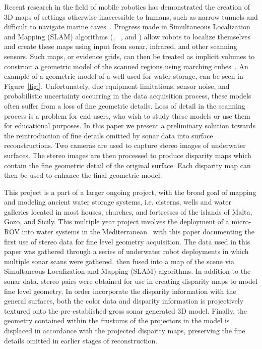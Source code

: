 \documentclass[a4paper,twoside]{article}
\begin{document}

\noindent Recent research in the field of mobile robotics has demonstrated the creation of 3D maps of settings otherwise inaccessible to humans, such as narrow tunnels and difficult to navigate marine caves~\cite{ICEX11,McVicker,McVicker2}. Progress made in Simultaneous Localization and Mapping (SLAM) algorithms  (\cite{Williams2000}, ~\cite{harbor}, and \cite{Fairfield2005,Fairfield2006}) allow robots to localize themselves and create these maps using input from sonar, infrared, and other scanning sensors. Such maps, or evidence grids, can then be treated as implicit volumes to construct a geometric model of the scanned regions using marching cubes~\cite{Lorensen}. An example of a geometric model of a well used for water storage, can be seen in Figure~\ref{fig:}.
Unfortunately, due equipment limitations, sensor noise, and probabilistic uncertainty occurring in the  data acquisition process, these models often suffer from a loss of fine geometric details. Loss of detail in the scanning process is a problem for end-users, who wish to study these models or use them for educational purposes.
In this paper we present a preliminary solution towards the reintroduction of fine details omitted by sonar data into surface reconstructions.  
Two cameras are used to capture stereo images of underwater surfaces.
The stereo images are then processed to produce disparity maps which contain the fine geometric detail of the original surface.
Each disparity map can then be used to enhance the final geometric model.

This project is a part of a larger ongoing project, with the broad goal of mapping and modeling ancient water storage systems, i.e. cisterns, wells and water galleries located in most houses, churches, and fortresses of the islands of Malta, Gozo, and Sicily. This multiple year project involves the deployment of a micro-ROV into water systems in the Mediterranean~\cite{White10,ICEX11,McVicker,McVicker2} with this paper documenting the first use of stereo data for fine level geometry acquisition. The data used in this paper was gathered through a series of underwater robot deployments in which multiple sonar scans were gathered, then fused into a map of the scene via Simultaneous Localization and Mapping (SLAM) algorithms. In addition to the sonar data, stereo pairs were obtained for use in creating disparity maps to model fine level geometry. In order incorporate the disparity information with the general surfaces, both the color data and disparity information is projectively textured onto the pre-established gross sonar generated 3D model. Finally, the geometry contained within the frustums of the projectors in the model is displaced in accordance with the projected disparity maps, preserving the fine details omitted in earlier stages of reconstruction.
\end{document}
